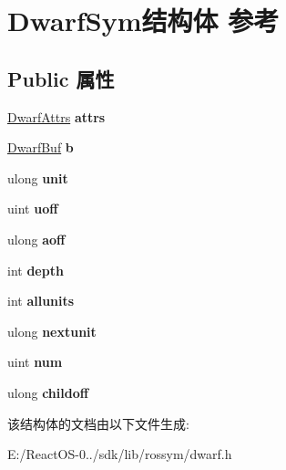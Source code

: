 \hypertarget{struct_dwarf_sym}{}\section{Dwarf\+Sym结构体 参考}
\label{struct_dwarf_sym}
\subsection*{Public 属性}
\begin{DoxyCompactItemize}
\item 
\mbox{\label{struct_dwarf_sym_a2013103c025feac73536d7899b0af566}} 
\hyperlink{struct_dwarf_attrs}{Dwarf\+Attrs} {\bfseries attrs}
\item 
\mbox{\label{struct_dwarf_sym_a790839f71d7621a101ca35688795079b}} 
\hyperlink{struct_dwarf_buf}{Dwarf\+Buf} {\bfseries b}
\item 
\mbox{\label{struct_dwarf_sym_ad98ed279db5bd80e98798f0f6055a4e5}} 
ulong {\bfseries unit}
\item 
\mbox{\label{struct_dwarf_sym_aef70c1432b0aafbcc2aacb6c1250d5fa}} 
uint {\bfseries uoff}
\item 
\mbox{\label{struct_dwarf_sym_a4427e8dd83ff203045241b18be44d5b5}} 
ulong {\bfseries aoff}
\item 
\mbox{\label{struct_dwarf_sym_ac3401e53e9bfdfe423f7e43b880fd3af}} 
int {\bfseries depth}
\item 
\mbox{\label{struct_dwarf_sym_a279bdbc91e4a709f9effb53f50f200db}} 
int {\bfseries allunits}
\item 
\mbox{\label{struct_dwarf_sym_a71a8efa1fe26aa90655d8c8515fa331d}} 
ulong {\bfseries nextunit}
\item 
\mbox{\label{struct_dwarf_sym_a7cb540da0cf8d91363f97b8c2e33fa71}} 
uint {\bfseries num}
\item 
\mbox{\label{struct_dwarf_sym_a641863ea4f24418ccaaa4db36d9bfb1d}} 
ulong {\bfseries childoff}
\end{DoxyCompactItemize}


该结构体的文档由以下文件生成\+:\begin{DoxyCompactItemize}
\item 
E\+:/\+React\+O\+S-\/0../sdk/lib/rossym/dwarf.\+h\end{DoxyCompactItemize}
